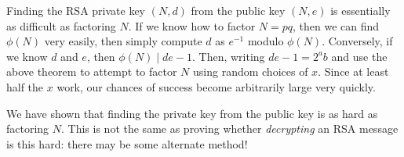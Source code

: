 \documentclass{article}
\begin{document}
\begin{corollary}
    Finding the RSA private key $(N, d)$ from the public key $(N, e)$ is essentially as difficult as factoring $N$. If we know how to factor $N = pq$, then we can find $\phi(N)$ very easily, then simply compute $d$ as $e^{-1}$ modulo $\phi(N)$. Conversely, if we know $d$ and $e$, then $\phi(N) \mid de-1$. Then, writing $de-1 = 2^ab$ and use the above theorem to attempt to factor $N$ using random choices of $x$. Since at least half the $x$ work, our chances of success become arbitrarily large very quickly.
\end{corollary}

\begin{note}
	We have shown that finding the private key from the public key is as hard as factoring $N$. This is not the same as proving whether \textit{decrypting} an RSA message is this hard: there may be some alternate method!
\end{note}
\end{document}
